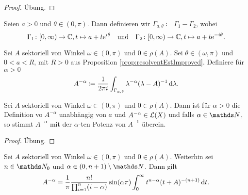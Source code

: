 \begin{proof}
  Übung.
\end{proof}

\begin{ntion}
  Seien $a > 0$ und $\theta \in (0,\pi)$.
  Dann definieren wir $\Gamma_{a,\theta} \coloneqq \Gamma_1 - \Gamma_2$, wobei
  $$
    \Gamma_1 \colon [0,\infty) \to \mathbb{C}, t \mapsto a + t\mathrm{e}^{i\theta} \quad\text{und} \quad
    \Gamma_2 \colon [0,\infty) \to \mathbb{C}, t \mapsto a + t\mathrm{e}^{-i\theta}.
  $$
\end{ntion}

\begin{defn}
  Sei $A$ sektoriell von Winkel $\omega \in (0,\pi)$ und $0 \in \rho(A)$.
  Sei $\theta \in (\omega,\pi)$ und $0 < a < R$, mit $R > 0$ aus Proposition \ref{prop:resolventEstImproved}.
  Definiere für $\alpha > 0$
  $$
  A^{-\alpha} \coloneqq \frac{1}{2\pi i} \int_{\Gamma_{a,\theta}} \lambda^{-\alpha} (\lambda - A)^{-1} \, {\operatorname{d}\!{\lambda}}.
  $$
\end{defn}

\begin{prop}
  \label{prop:natPow}
  Sei $A$ sektoriell von Winkel $\omega \in (0,\pi)$ und $0 \in \rho(A)$.
  Dann ist für $\alpha > 0$ die Definition vo $A^{-\alpha}$ unabhängig von $a$ und $A^{-\alpha} \in \mathcal{L}(X)$ und falls $\alpha \in \N$, so stimmt $A^{-\alpha}$ mit der $\alpha$-ten Potenz von $A^{-1}$ überein.
\end{prop}

\begin{proof}
  Übung.
\end{proof}

\begin{thm}
  \label{thm:negFracPower}
  Sei $A$ sektoriell von Winkel $\omega \in (0,\pi)$ und $0 \in \rho(A)$.
  Weiterhin sei $n \in \N_0$ und $\alpha \in (0,n+1) \setminus \N$.
  Dann gilt
  $$
  A^{-\alpha} = \frac{1}{\pi} \frac{n!}{\prod_{i = 1}^n(i - \alpha)} \sin(\alpha\pi) \int_0^\infty t^{n - \alpha} ( t + A)^{-(n+1)} \, {\operatorname{d}\!{t}}.
  $$
\end{thm}

